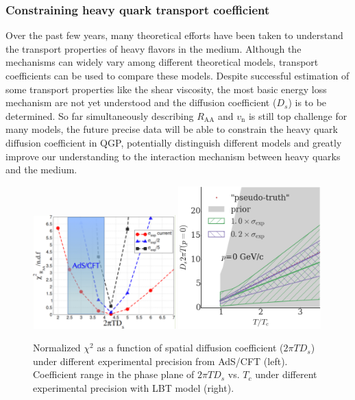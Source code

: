 \subsubsection{Constraining heavy quark transport coefficient}
Over the past few years, many theoretical efforts have been taken to understand the transport properties of heavy flavors in the medium. Although the mechanisms can widely vary among different theoretical models, transport coefficients can be used to compare these models. Despite successful estimation of some transport properties like the shear viscosity, the most basic energy loss mechanism are not yet understood and the diffusion coefficient ($D_{s}$) is to be determined. So far simultaneously describing $R_{\mathrm{AA}}$ and $v_{\mathrm{n}}$ is still top challenge for many models, the future precise data will be able to constrain the heavy quark diffusion coefficient in QGP, potentially distinguish different models and greatly improve our understanding to the interaction mechanism between heavy quarks and the medium.

\begin{figure}[ht]
  \begin{center}
    \includegraphics[width=0.49\textwidth]{hf/figures/Greco.pdf}
    \includegraphics[width=0.49\textwidth]{hf/figures/Plot_D2piT_posterior_p0.png}
    \caption{Normalized $\chi^{2}$ as a function of spatial diffusion coefficient ($2\pi TD_{s}$) under different experimental precision from AdS/CFT (left). Coefficient range in the phase plane of $2\pi TD_{s}$ vs. $T_{c}$ under different experimental precision with LBT model (right).}
    \label{fig:RAAv2.Dstheory}
  \end{center}
\end{figure}

